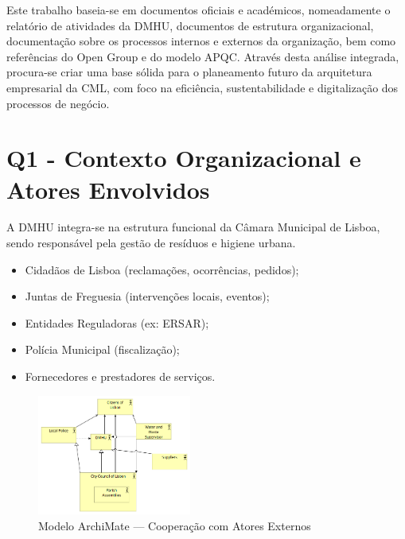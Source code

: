 \documentclass[12pt,a4paper,final]{article}
\begin{document}
    Este trabalho baseia-se em documentos oficiais e académicos, nomeadamente o relatório de atividades da DMHU, documentos de estrutura organizacional, documentação sobre os processos internos e externos da organização, bem como referências do Open Group e do modelo APQC. Através desta análise integrada, procura-se criar uma base sólida para o planeamento futuro da arquitetura empresarial da CML, com foco na eficiência, sustentabilidade e digitalização dos processos de negócio.


    \section*{Q1 - Contexto Organizacional e Atores Envolvidos}\label{sec:contexto-organizacional-e-atores-envolvidos}
    A DMHU integra-se na estrutura funcional da Câmara Municipal de Lisboa, sendo responsável pela gestão de resíduos e higiene urbana.
    \begin{itemize}
        \item Cidadãos de Lisboa (reclamações, ocorrências, pedidos);
        \item Juntas de Freguesia (intervenções locais, eventos);
        \item Entidades Reguladoras (ex: ERSAR);
        \item Polícia Municipal (fiscalização);
        \item Fornecedores e prestadores de serviços.
    \end{itemize}

    \begin{figure}[h!]
        \centering
        \includegraphics[width=0.45\textwidth]{Q1 - DHMU Context}
        \caption{Modelo ArchiMate — Cooperação com Atores Externos}
        \label{fig:1}
    \end{figure}
\end{document}
